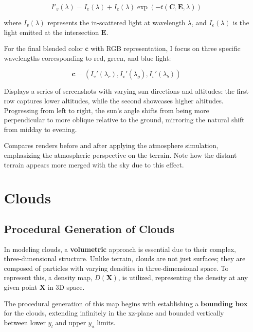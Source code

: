 \begin{equation}
    I'_v(\lambda) = I_v(\lambda) + I_e(\lambda)\exp(-t(\mathbf{C}, \mathbf{E}, \lambda))
\end{equation}

where $I_v(\lambda)$ represents the in-scattered light at wavelength $\lambda$, and $I_e(\lambda)$ is the light emitted at the intersection $\mathbf{E}$. 

For the final blended color $\mathbf{c}$ with RGB representation, I focus on three specific wavelengths corresponding to red, green, and blue light:

\begin{equation}
\mathbf{c} = (I_{v}'(\lambda_r), I_{v}'(\lambda_g), I_{v}'(\lambda_b))
\end{equation}

{Displays a series of screenshots with varying sun directions and altitudes: the first row captures lower altitudes, while the second showcases higher altitudes. Progressing from left to right, the sun's angle shifts from being more perpendicular to more oblique relative to the ground, mirroring the natural shift from midday to evening.}

{Compares renders before and after applying the atmosphere simulation, emphasizing the atmospheric perspective on the terrain. Note how the distant terrain appears more merged with the sky due to this effect.}

\section{Clouds}

\subsection{Procedural Generation of Clouds}

In modeling clouds, a \textbf{volumetric} approach is essential due to their complex, three-dimensional structure. Unlike terrain, clouds are not just surfaces; they are composed of particles with varying densities in three-dimensional space. To represent this, a density map, $D(\mathbf{X})$, is utilized, representing the density at any given point $\mathbf{X}$ in 3D space.

The procedural generation of this map begins with establishing a \textbf{bounding box} for the clouds, extending infinitely in the xz-plane and bounded vertically between lower $y_l$ and upper $y_u$ limits.

